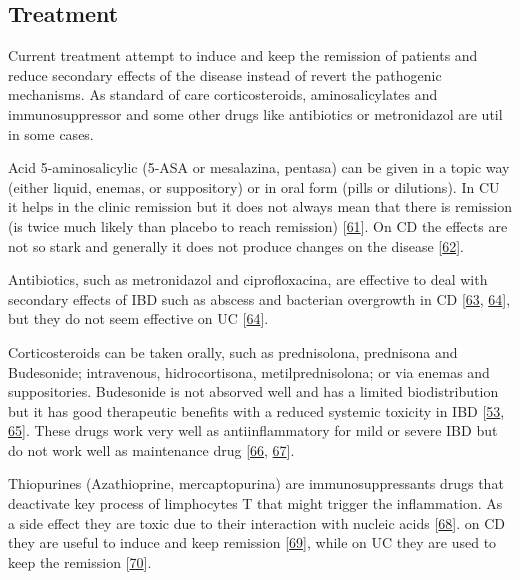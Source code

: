 \documentclass[
  12pt,
  a4paper,
  twoside,
  openright]{book}
\begin{document}
\hypertarget{treatment}{%
\subsection{Treatment}\label{treatment}}

Current treatment attempt to induce and keep the remission of patients and reduce secondary effects of the disease instead of revert the pathogenic mechanisms.
As standard of care corticosteroids, aminosalicylates and immunosuppressor and some other drugs like antibiotics or metronidazol are util in some cases.

Acid 5-aminosalicylic (5-ASA or mesalazina, pentasa) can be given in a topic way (either liquid, enemas, or suppository) or in oral form (pills or dilutions).
In CU it helps in the clinic remission but it does not always mean that there is remission (is twice much likely than placebo to reach remission) {[}\protect\hyperlink{ref-travis2006}{61}{]}.
On CD the effects are not so stark and generally it does not produce changes on the disease {[}\protect\hyperlink{ref-akobeng2016}{62}{]}.

Antibiotics, such as metronidazol and ciprofloxacina, are effective to deal with secondary effects of IBD such as abscess and bacterian overgrowth in CD {[}\protect\hyperlink{ref-feller2010}{63}, \protect\hyperlink{ref-prantera2009}{64}{]}, but they do not seem effective on UC {[}\protect\hyperlink{ref-prantera2009}{64}{]}.

Corticosteroids can be taken orally, such as prednisolona, prednisona and Budesonide; intravenous, hidrocortisona, metilprednisolona; or via enemas and suppositories.
Budesonide is not absorved well and has a limited biodistribution but it has good therapeutic benefits with a reduced systemic toxicity in IBD {[}\protect\hyperlink{ref-peyrin-biroulet2010}{53}, \protect\hyperlink{ref-rezaie2015}{65}{]}.
These drugs work very well as antiinflammatory for mild or severe IBD but do not work well as maintenance drug {[}\protect\hyperlink{ref-lichtenstein2009}{66}, \protect\hyperlink{ref-ouellette2001}{67}{]}.

Thiopurines (Azathioprine, mercaptopurina) are immunosuppressants drugs that deactivate key process of limphocytes T that might trigger the inflammation.
As a side effect they are toxic due to their interaction with nucleic acids {[}\protect\hyperlink{ref-warner2018}{68}{]}.
on CD they are useful to induce and keep remission {[}\protect\hyperlink{ref-chande2015}{69}{]}, while on UC they are used to keep the remission {[}\protect\hyperlink{ref-gisbert2009}{70}{]}.
\end{document}
